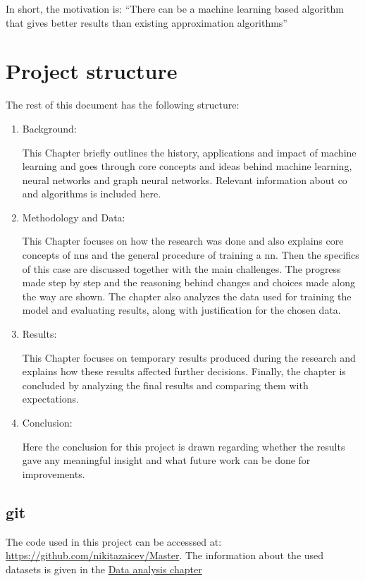 In short, the motivation is: “There can be a machine learning based algorithm that gives better results than existing approximation algorithms”

\section{Project structure}

The rest of this document has the following structure:

\begin{enumerate}

\item Background:

This Chapter briefly outlines the history, applications and impact of machine learning and goes through core concepts and ideas behind machine learning, neural networks and graph neural networks. Relevant information about \gls{co} and algorithms is included here.

\item Methodology and Data:

This Chapter focuses on how the research was done and also explains core concepts of \gls{nn}s and the general procedure of training a \gls{nn}. Then the specifics of this case are discussed together with the main challenges. The progress made step by step and the reasoning behind changes and choices made along the way are shown. The chapter also analyzes the data used for training the model and evaluating results, along with justification for the chosen data.

\item Results:

This Chapter focuses on temporary results produced during the research and explains how these results affected further decisions. Finally, the chapter is concluded by analyzing the final results and comparing them with expectations.

\item Conclusion:

Here the conclusion for this project is drawn regarding whether the results gave any meaningful insight and what future work can be done for improvements.

\end{enumerate}

\subsection{\gls{git}}

The code used in this project can be accesssed at: \url{https://github.com/nikitazaicev/Master}. The information about the used datasets is given in the \hyperref[sec:dataanalysis]{Data analysis chapter}